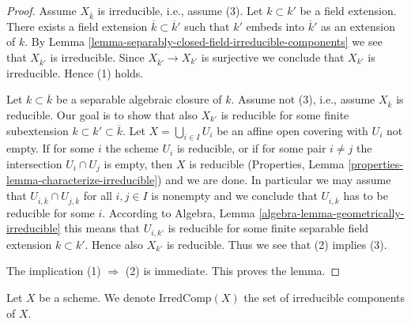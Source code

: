 \begin{proof}
Assume $X_{\overline{k}}$ is irreducible, i.e., assume (3).
Let $k \subset k'$ be a field extension.
There exists a field extension $\overline{k} \subset \overline{k}'$
such that $k'$ embeds into $\overline{k}'$ as an extension of $k$.
By Lemma \ref{lemma-separably-closed-field-irreducible-components}
we see that $X_{\overline{k}'}$ is irreducible.
Since $X_{\overline{k}'} \to X_{k'}$ is surjective we conclude
that $X_{k'}$ is irreducible. Hence (1) holds.

\medskip\noindent
Let $k \subset \overline{k}$ be a separable algebraic closure of $k$.
Assume not (3), i.e., assume $X_{\overline{k}}$ is reducible.
Our goal is to show that also $X_{k'}$ is
reducible for some finite subextension
$k \subset k' \subset \overline{k}$.
Let $X = \bigcup_{i \in I} U_i$ be an affine open covering
with $U_i$ not empty. If for some $i$ the scheme
$U_i$ is reducible, or if for some pair $i \not = j$ the
intersection $U_i \cap U_j$ is empty, then $X$ is reducible
(Properties, Lemma \ref{properties-lemma-characterize-irreducible})
and we are done.
In particular we may assume that
$U_{i, \overline{k}} \cap U_{j, \overline{k}}$ for all $i, j \in I$
is nonempty and we conclude that $U_{i, \overline{k}}$ has
to be reducible for some $i$. According to
Algebra, Lemma \ref{algebra-lemma-geometrically-irreducible}
this means that $U_{i, k'}$ is reducible for some
finite separable field extension $k \subset k'$.
Hence also $X_{k'}$ is reducible. Thus we see that
(2) implies (3).

\medskip\noindent
The implication (1) $\Rightarrow$ (2) is immediate.
This proves the lemma.
\end{proof}

\noindent
Let $X$ be a scheme. We denote $\text{IrredComp}(X)$ the set of
irreducible components of $X$.


